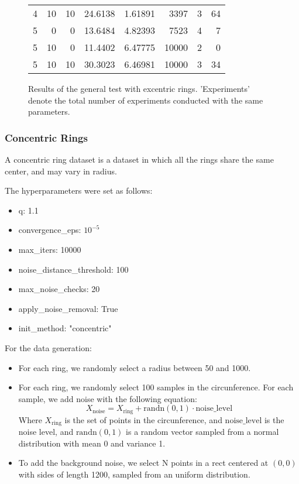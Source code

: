 \documentclass[conference]{IEEEtran}
\begin{document}
\begin{figure*}[!ht]
\begin{tabular}{rrrrrrrr}
                     4 &           10 &                 10 &     24.6138  &    1.61891     &      3397    &             3 &              64       \\
                     5 &            0 &                  0 &     13.6484  &    4.82393     &      7523    &             4 &               7       \\
                     5 &           10 &                  0 &     11.4402  &    6.47775     &     10000    &             2 &               0       \\
                     5 &           10 &                 10 &     30.3023  &    6.46981     &     10000    &             3 &              34       \\
    \hline
    \end{tabular}
\caption{Results of the general test with excentric rings. 'Experiments' denote the total number of experiments conducted with the same parameters.}
\end{figure*}

\subsubsection{Concentric Rings}
A concentric ring dataset is a dataset in which all the rings share the same center, and may vary in radius.

The hyperparameters were set as follows:

\begin{itemize}
    \item q: 1.1
    \item convergence\_eps: $10^{-5}$
    \item max\_iters: 10000
    \item noise\_distance\_threshold: 100
    \item max\_noise\_checks: 20
    \item apply\_noise\_removal: True
    \item init\_method: "concentric"
\end{itemize}

For the data generation:
\begin{itemize}
    \item For each ring, we randomly select a radius between 50 and 1000.
    \item For each ring, we randomly select 100 samples in the circunference. For each sample, we add noise with the following equation:
    \begin{equation}
        X_{\text{noise}} = X_{\text{ring}} + \text{randn}(0, 1) \cdot \text{noise\_level}
    \end{equation}
    Where $X_{\text{ring}}$ is the set of points in the circunference, and $\text{noise\_level}$ is the noise level, and $\text{randn}(0, 1)$ is a random vector sampled from a normal distribution with mean 0 and variance 1.
    \item To add the background noise, we select N points in a rect centered at $(0, 0)$ with sides of length 1200, sampled from an uniform distribution.
\end{itemize}
\end{document}
